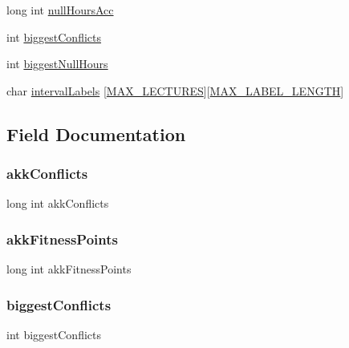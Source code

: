 \begin{DoxyCompactItemize}
\item 
long int \hyperlink{structparams_a7603f636641dd6762e9a1582394063f0}{null\+Hours\+Acc}
\item 
int \hyperlink{structparams_aeceaf128c1a93e23f79533ff51d9ebd9}{biggest\+Conflicts}
\item 
int \hyperlink{structparams_a9b6eb91317b38a72b50eced2b8fbbafc}{biggest\+Null\+Hours}
\item 
char \hyperlink{structparams_a0f99e938bd12ec5d93841fe380ed9e82}{interval\+Labels} \mbox{[}\hyperlink{main_8c_a152499a7a91751df0c7f203a60a88003}{M\+A\+X\+\_\+\+L\+E\+C\+T\+U\+R\+ES}\mbox{]}\mbox{[}\hyperlink{main_8c_a40953fb1d014188b77bbf6d21d0b3e6c}{M\+A\+X\+\_\+\+L\+A\+B\+E\+L\+\_\+\+L\+E\+N\+G\+TH}\mbox{]}
\end{DoxyCompactItemize}


\subsection{Field Documentation}
\hypertarget{structparams_a65246c200b5a0a3b217127742e782a70}{}\label{structparams_a65246c200b5a0a3b217127742e782a70} 
\subsubsection{\texorpdfstring{akk\+Conflicts}{akkConflicts}}
{\footnotesize\ttfamily long int akk\+Conflicts}

\hypertarget{structparams_a396ffba445476cab3ea4da965ec8dfcd}{}\label{structparams_a396ffba445476cab3ea4da965ec8dfcd} 
\subsubsection{\texorpdfstring{akk\+Fitness\+Points}{akkFitnessPoints}}
{\footnotesize\ttfamily long int akk\+Fitness\+Points}

\hypertarget{structparams_aeceaf128c1a93e23f79533ff51d9ebd9}{}\label{structparams_aeceaf128c1a93e23f79533ff51d9ebd9} 
\subsubsection{\texorpdfstring{biggest\+Conflicts}{biggestConflicts}}
{\footnotesize\ttfamily int biggest\+Conflicts}

